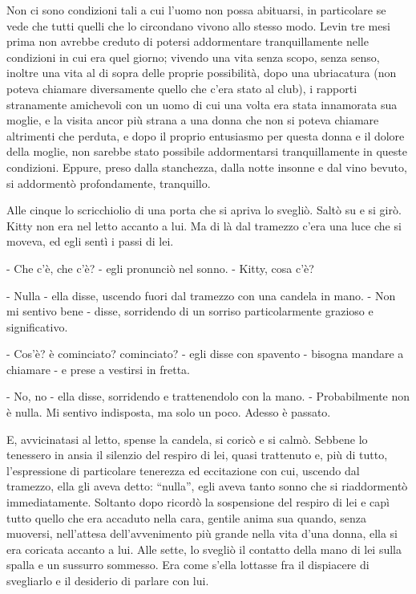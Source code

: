 Non ci sono condizioni tali a cui l'uomo non possa abituarsi, in particolare se vede che tutti quelli che lo circondano vivono allo stesso modo. Levin tre mesi prima non avrebbe creduto di potersi addormentare tranquillamente nelle condizioni in cui era quel giorno; vivendo una vita senza scopo, senza senso, inoltre una vita al di sopra delle proprie possibilità, dopo una ubriacatura (non poteva chiamare diversamente quello che c'era stato al club), i rapporti stranamente amichevoli con un uomo di cui una volta era stata innamorata sua moglie, e la visita ancor più strana a una donna che non si poteva chiamare altrimenti che perduta, e dopo il proprio entusiasmo per questa donna e il dolore della moglie, non sarebbe stato possibile addormentarsi tranquillamente in queste condizioni. Eppure, preso dalla stanchezza, dalla notte insonne e dal vino bevuto, si addormentò profondamente, tranquillo. 

Alle cinque lo scricchiolio di una porta che si apriva lo svegliò. Saltò su e si girò. Kitty non era nel letto accanto a lui. Ma di là dal tramezzo c'era una luce che si moveva, ed egli sentì i passi di lei. 

- Che c'è, che c'è? - egli pronunciò nel sonno. - Kitty, cosa c'è? 

- Nulla - ella disse, uscendo fuori dal tramezzo con una candela in mano. - Non mi sentivo bene - disse, sorridendo di un sorriso particolarmente grazioso e significativo. 

- Cos'è? è cominciato? cominciato? - egli disse con spavento - bisogna mandare a chiamare - e prese a vestirsi in fretta. 

- No, no - ella disse, sorridendo e trattenendolo con la mano. - Probabilmente non è nulla. Mi sentivo indisposta, ma solo un poco. Adesso è passato. 

E, avvicinatasi al letto, spense la candela, si coricò e si calmò. Sebbene lo tenessero in ansia il silenzio del respiro di lei, quasi trattenuto e, più di tutto, l'espressione di particolare tenerezza ed eccitazione con cui, uscendo dal tramezzo, ella gli aveva detto: ``nulla'', egli aveva tanto sonno che si riaddormentò immediatamente. Soltanto dopo ricordò la sospensione del respiro di lei e capì tutto quello che era accaduto nella cara, gentile anima sua quando, senza muoversi, nell'attesa dell'avvenimento più grande nella vita d'una donna, ella si era coricata accanto a lui. Alle sette, lo svegliò il contatto della mano di lei sulla spalla e un sussurro sommesso. Era come s'ella lottasse fra il dispiacere di svegliarlo e il desiderio di parlare con lui. 

